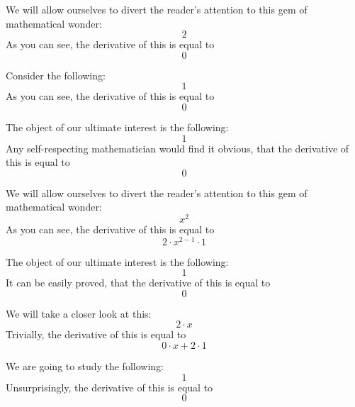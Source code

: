 \documentclass{article}
\begin{document}
We will allow ourselves to divert the reader's attention to this gem of mathematical wonder:
\begin{equation}
2 
\end{equation}
As you can see, the derivative of this is equal to
\begin{equation}
0 
\end{equation}

Consider the following:
\begin{equation}
1 
\end{equation}
As you can see, the derivative of this is equal to
\begin{equation}
0 
\end{equation}

The object of our ultimate interest is the following:
\begin{equation}
1 
\end{equation}
Any self-respecting mathematician would find it obvious, that the derivative of this is equal to
\begin{equation}
0 
\end{equation}

We will allow ourselves to divert the reader's attention to this gem of mathematical wonder:
\begin{equation}
x ^{2 } 
\end{equation}
As you can see, the derivative of this is equal to
\begin{equation}
2 \cdot x ^{2 - 1 } \cdot 1 
\end{equation}

The object of our ultimate interest is the following:
\begin{equation}
1 
\end{equation}
It can be easily proved, that the derivative of this is equal to
\begin{equation}
0 
\end{equation}

We will take a closer look at this:
\begin{equation}
2 \cdot x 
\end{equation}
Trivially, the derivative of this is equal to
\begin{equation}
0 \cdot x + 2 \cdot 1 
\end{equation}

We are going to study the following:
\begin{equation}
1 
\end{equation}
Unsurprisingly, the derivative of this is equal to
\begin{equation}
0 
\end{equation}
\end{document}
